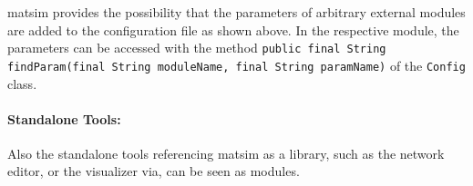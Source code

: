 \gls{matsim} provides the possibility that the parameters of arbitrary external modules are added to the configuration file as shown above. In the respective module, the parameters can be accessed with the method \lstinline|public final String findParam(final String moduleName, final String paramName)| of the \lstinline|Config| class.


\paragraph{Standalone Tools:} %
Also the standalone tools referencing \gls{matsim} as a library, such as the network editor, or the visualizer via, can be seen as modules.


%


